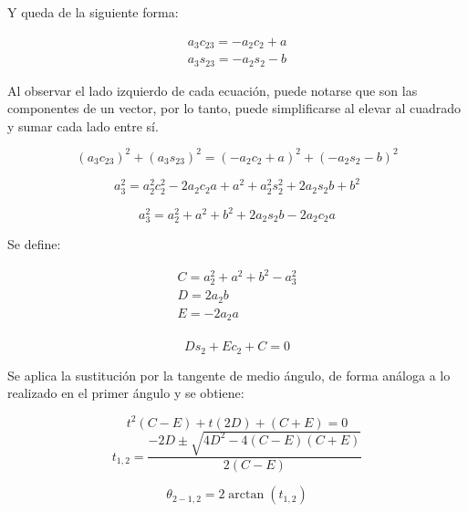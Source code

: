 \documentclass{article}
\begin{document}
Y queda de la siguiente forma:

\begin{equation}
    \label{eq:theta_2}
    \begin{gathered}
        a_3c_{23}=-a_2c_2+a\\
        a_3s_{23}=-a_2s_2-b
    \end{gathered}
\end{equation}

Al observar el lado izquierdo de cada ecuación, puede notarse que son las componentes de un vector, por lo tanto, puede simplificarse al elevar al cuadrado y sumar cada lado entre sí.

\begin{equation}
        (a_3c_{23})^2+(a_3s_{23})^2=(-a_2c_2+a)^2+(-a_2s_2-b)^2
\end{equation}

\begin{equation}
    a_3^2=a_2^2c_2^2-2a_2c_2a+a^2+a_2^2s_2^2+2a_2s_2b+b^2
\end{equation}

\begin{equation}
    a_3^2=a_2^2+a^2+b^2+2a_2s_2b-2a_2c_2a
\end{equation}

Se define:

\begin{equation}
    \begin{gathered}
        C=a_2^2+a^2+b^2-a_3^2\\
        D=2a_2b\\
        E=-2a_2a\\
    \end{gathered}
\end{equation}

\begin{equation}
    Ds_2+Ec_2+C=0
\end{equation}

Se aplica la sustitución por la tangente de medio ángulo, de forma análoga a lo realizado en el primer ángulo y se obtiene:

\begin{equation}
    t^2(C-E)+t(2D)+(C+E)=0
\end{equation}
\begin{equation}
    t_{1,2}=\frac{-2D\pm \sqrt{4D^2-4(C-E)(C+E)}}{2(C-E)}
\end{equation}

\begin{equation}
    \theta_{2-1,2} = 2\arctan(t_{1,2})
\end{equation}
\end{document}
